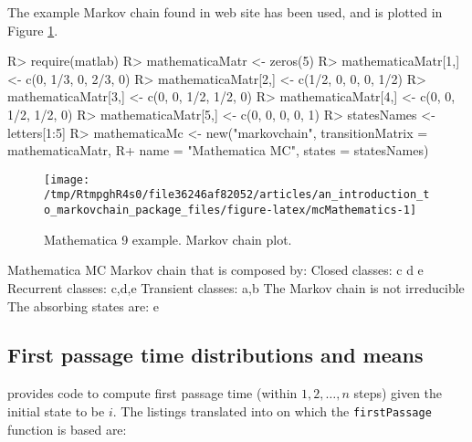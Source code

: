 \documentclass[
  nojss]{jss}
\begin{document}
The example Markov chain found in  web site \citep{mathematica9MarkovChain} has
been used, and is plotted in Figure \ref{fig:mcMathematics}.

\begin{CodeChunk}

\begin{CodeInput}
R> require(matlab)
R> mathematicaMatr <- zeros(5)
R> mathematicaMatr[1,] <- c(0, 1/3, 0, 2/3, 0)
R> mathematicaMatr[2,] <- c(1/2, 0, 0, 0, 1/2)
R> mathematicaMatr[3,] <- c(0, 0, 1/2, 1/2, 0)
R> mathematicaMatr[4,] <- c(0, 0, 1/2, 1/2, 0)
R> mathematicaMatr[5,] <- c(0, 0, 0, 0, 1)
R> statesNames <- letters[1:5]
R> mathematicaMc <- new("markovchain", transitionMatrix = mathematicaMatr,
R+                    name = "Mathematica MC", states = statesNames)
\end{CodeInput}
\end{CodeChunk}

\begin{CodeChunk}
\begin{figure}

{\centering \texttt{[image: /tmp/RtmpghR4s0/file36246af82052/articles/an\_introduction\_to\_markovchain\_package\_files/figure-latex/mcMathematics-1]} 

}

\caption[Mathematica 9 example]{Mathematica 9 example. Markov chain plot.}\label{fig:mcMathematics}
\end{figure}
\end{CodeChunk}

\begin{CodeChunk}

\begin{CodeOutput}
Mathematica MC  Markov chain that is composed by: 
Closed classes: 
c d 
e 
Recurrent classes: 
{c,d},{e}
Transient classes: 
{a,b}
The Markov chain is not irreducible 
The absorbing states are: e
\end{CodeOutput}
\end{CodeChunk}

\hypertarget{first-passage-time-distributions-and-means}{%
\subsection{First passage time distributions and means}\label{first-passage-time-distributions-and-means}}

\cite{renaldoMatlab} provides code to compute first passage time (within \(1,2,\ldots, n\) steps) given the initial state to be \(i\). The  listings translated into  on which the \texttt{firstPassage} function is based are:
\end{document}
